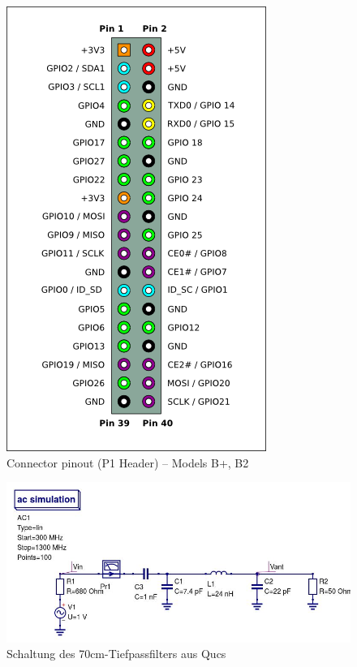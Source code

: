 \begin{figure}[H]
    \includegraphics[height=0.4\textheight]{Schwingkreis/Bilder/Pi-GPIO-header.png}
    \caption{Connector pinout (P1 Header) -- Models B+, B2}
    \label{rpi}
\end{figure}

\begin{figure}[H]
    \centering
    \includegraphics[width=1\textwidth]{Schwingkreis/Bilder/70cmLP500Ohm.jpg}
    \caption{Schaltung des 70cm-Tiefpassfilters aus Qucs}
    \label{70cmLP}
\end{figure}

